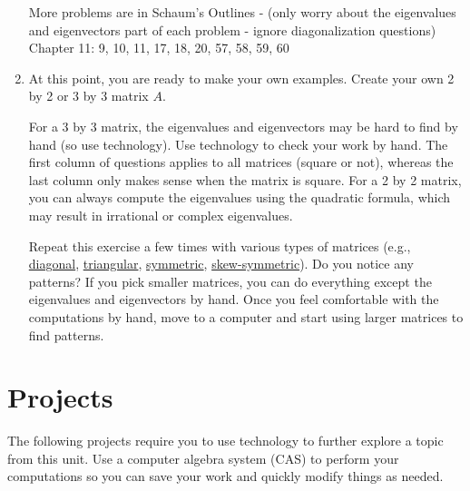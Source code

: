 \begin{enumerate}
More problems are in Schaum's Outlines - 
(only worry about the eigenvalues and eigenvectors part of each problem - ignore diagonalization questions)
Chapter 11: 9, 10, 11, 17, 18, 20, 57, 58, 59, 60



\item At this point, you are ready to make your own examples. Create your own 2 by 2 or 3 by 3 matrix $A$.
\begin{itemize}
\end{itemize}
For a 3 by 3 matrix, the eigenvalues and eigenvectors may be hard to find by hand (so use technology).
Use technology to check your work by hand. The first column of questions applies to all matrices (square or not), whereas the last column only makes sense when the matrix is square. For a 2 by 2 matrix, you can always compute the eigenvalues using the quadratic formula, which may result in irrational or complex eigenvalues. 

Repeat this exercise a few times with various types of matrices (e.g., \href{http://en.wikipedia.org/wiki/Diagonal_matrix}{diagonal}, \href{http://en.wikipedia.org/wiki/Triangular_matrix}{triangular}, \href{http://en.wikipedia.org/wiki/Symmetric_matrix}{symmetric}, \href{http://en.wikipedia.org/wiki/Antisymmetric_matrix}{skew-symmetric}). Do you notice any patterns? If you pick smaller matrices, you can do everything except the eigenvalues and eigenvectors by hand. Once you feel comfortable with the computations by hand, move to a computer and start using larger matrices to find patterns. 

\end{enumerate}



\section{Projects}
The following projects require you to use technology to further explore a topic from this unit. Use a computer algebra system (CAS) to perform your computations so you can save your work and quickly modify things as needed. 

